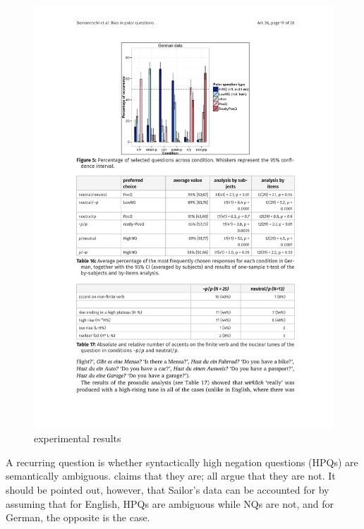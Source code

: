 \documentclass[output=paper,colorlinks,citecolor=brown]{langscibook}
\begin{document}
\begin{figure}
\includegraphics[height=.45\textheight]{figures/Domaneschi-2.pdf}
\caption{ experimental results}
\label{fig:chart23}
\end{figure}

A recurring question is whether syntactically high negation questions (HPQs) are semantically ambiguous. \citet{Ladd:1981} claims that they are; \citet{sailor2012remarks, anderbois2019, goodhue2022} all argue that they are not. It should be pointed out, however, that Sailor's data can be accounted for by assuming that for English, HPQs are ambiguous while NQs are not, and for German, the opposite is the case. %
\end{document}
